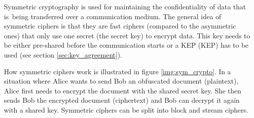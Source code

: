 Symmetric cryptography is used for maintaining the confidentiality of data that is~being transferred over a communication medium. The general idea of symmetric ciphers is that they are fast ciphers (compared to the asymmetric ones) that only use one secret (the secret key) to encrypt data. This key needs to be either pre-shared before the communication starts or a KEP ({\acl{KEP}}) has to be used (see section \ref{sec:key_agreement}). \cite{Ristic2014}

How symmetric ciphers work is illustrated in figure \ref{img:sym_crypto}. In a situation where Alice wants to send Bob an obfuscated document (plaintext), Alice first needs to encrypt the document with the shared secret key. She then sends Bob the encrypted document (ciphertext) and Bob can decrypt it again with a shared key. Symmetric ciphers can be split into block and stream ciphers.

